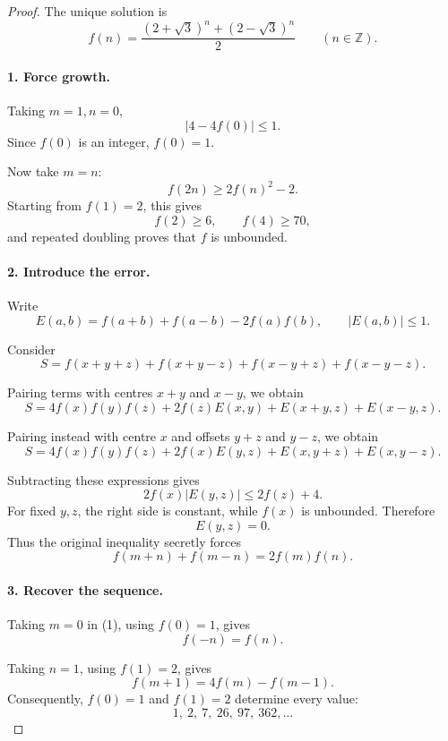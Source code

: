 
\begin{dlsummary}[title={\bfseries Solution 52. The Almost-Cosine Sequence},breakable]

\begin{proof}
The unique solution is
\[
\boxed{
f(n)=\frac{(2+\sqrt3)^n+(2-\sqrt3)^n}{2}
\qquad(n\in\mathbb Z).
}
\]

\paragraph{1. Force growth.}

Taking \(m=1,n=0\),
\[
|4-4f(0)|\le1.
\]
Since \(f(0)\) is an integer, \(f(0)=1\).

Now take \(m=n\):
\[
f(2n)\ge2f(n)^2-2.
\]
Starting from \(f(1)=2\), this gives
\[
f(2)\ge6,\qquad f(4)\ge70,
\]
and repeated doubling proves that \(f\) is unbounded.

\paragraph{2. Introduce the error.}

Write
\[
E(a,b)=f(a+b)+f(a-b)-2f(a)f(b),
\qquad |E(a,b)|\le1.
\]

Consider
\[
S=f(x+y+z)+f(x+y-z)+f(x-y+z)+f(x-y-z).
\]

Pairing terms with centres \(x+y\) and \(x-y\), we obtain
\[
S=
4f(x)f(y)f(z)
+2f(z)E(x,y)
+E(x+y,z)+E(x-y,z).
\]

Pairing instead with centre \(x\) and offsets \(y+z\) and \(y-z\), we obtain
\[
S=
4f(x)f(y)f(z)
+2f(x)E(y,z)
+E(x,y+z)+E(x,y-z).
\]

Subtracting these expressions gives
\[
2f(x)|E(y,z)|\le2f(z)+4.
\]
For fixed \(y,z\), the right side is constant, while \(f(x)\) is unbounded. Therefore
\[
E(y,z)=0.
\]
Thus the original inequality secretly forces
\[
\boxed{f(m+n)+f(m-n)=2f(m)f(n).} \tag{1}
\]

\paragraph{3. Recover the sequence.}

Taking \(m=0\) in (1), using \(f(0)=1\), gives
\[
f(-n)=f(n).
\]

Taking \(n=1\), using \(f(1)=2\), gives
\[
f(m+1)=4f(m)-f(m-1).
\]
Consequently, \(f(0)=1\) and \(f(1)=2\) determine every value:
\[
1,\ 2,\ 7,\ 26,\ 97,\ 362,\ldots
\]


\end{proof}
\end{dlsummary}
